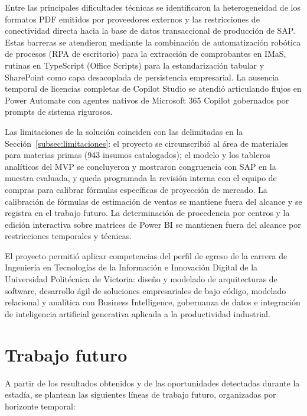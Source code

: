 Entre las principales dificultades técnicas se identificaron la heterogeneidad de los formatos PDF emitidos por proveedores externos y las restricciones de conectividad directa hacia la base de datos transaccional de producción de SAP. Estas barreras se atendieron mediante la combinación de automatización robótica de procesos (RPA de escritorio) para la extracción de comprobantes en IMaS, rutinas en TypeScript (Office Scripts) para la estandarización tabular y SharePoint como capa desacoplada de persistencia empresarial. La ausencia temporal de licencias completas de Copilot Studio se atendió articulando flujos en Power Automate con agentes nativos de Microsoft 365 Copilot gobernados por prompts de sistema rigurosos.

Las limitaciones de la solución coinciden con las delimitadas en la Sección~\ref{subsec:limitaciones}: el proyecto se circunscribió al área de materiales para materias primas (943 insumos catalogados); el modelo y los tableros analíticos del MVP se concluyeron y mostraron congruencia con SAP en la muestra evaluada, y queda programada la revisión interna con el equipo de compras para calibrar fórmulas específicas de proyección de mercado. La calibración de fórmulas de estimación de ventas se mantiene fuera del alcance y se registra en el trabajo futuro. La determinación de procedencia por centros y la edición interactiva sobre matrices de Power BI se mantienen fuera del alcance por restricciones temporales y técnicas.

El proyecto permitió aplicar competencias del perfil de egreso de la carrera de Ingeniería en Tecnologías de la Información e Innovación Digital de la Universidad Politécnica de Victoria: diseño y modelado de arquitecturas de software, desarrollo ágil de soluciones empresariales de bajo código, modelado relacional y analítica con Business Intelligence, gobernanza de datos e integración de inteligencia artificial generativa aplicada a la productividad industrial.

\section{Trabajo futuro} \label{sec:trabajo_futuro} %

A partir de los resultados obtenidos y de las oportunidades detectadas durante la estadía, se plantean las siguientes líneas de trabajo futuro, organizadas por horizonte temporal:

